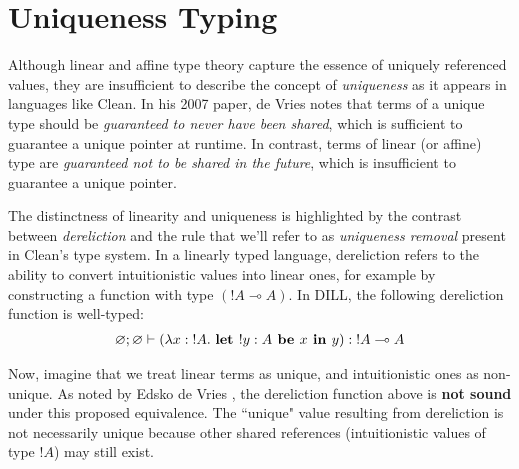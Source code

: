 \documentclass[]{unswthesis}
\let\emptyset\varnothing
\newcommand{\lam}[1]{\lambda #1 \ldotp \,}
\newcommand{\lolly}{\multimap}
\newcommand{\types}{\vdash}
\newcommand{\letbe}[3]{\textbf{let $#1$ be $#2$ in $#3$}}
\let\i\textit
\let\b\textbf
\begin{document}


\section{Uniqueness Typing}

Although linear and affine type theory capture the essence of uniquely referenced values, they are insufficient to describe the concept of \i{uniqueness} as it appears in languages like Clean. In his 2007 paper, de Vries \cite{deVries07} notes that terms of a unique type should be \i{guaranteed to never have been shared}, which is sufficient to guarantee a unique pointer at runtime. In contrast, terms of linear (or affine) type are \i{guaranteed not to be shared in the future}, which is insufficient to guarantee a unique pointer.

The distinctness of linearity and uniqueness is highlighted by the contrast between \i{dereliction} and the rule that we'll refer to as \i{uniqueness removal} present in Clean's type system. In a linearly typed language, dereliction refers to the ability to convert intuitionistic values into linear ones, for example by constructing a function with type $({!A} \lolly A)$. In DILL, the following dereliction function is well-typed:
\begin{eqnarray*}
\emptyset; \emptyset \types (\lam{x : {!A}} \letbe{!y : A}{x}{y}) : {!A} \lolly A
\end{eqnarray*}

Now, imagine that we treat linear terms as unique, and intuitionistic ones as non-unique. As noted by Edsko de Vries \cite{deVriesPhD08}, the dereliction function above is \b{not sound} under this proposed equivalence. The ``unique" value resulting from dereliction is not necessarily unique because other shared references (intuitionistic values of type ${!A}$) may still exist.
\end{document}
